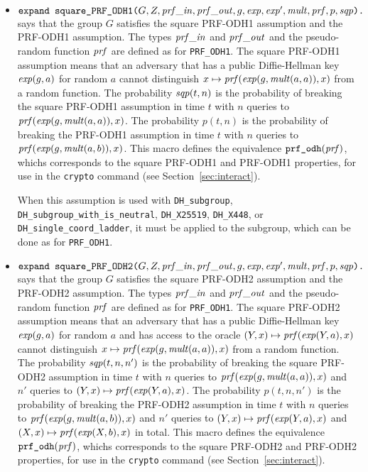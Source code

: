 \documentclass{article}
\begin{document}
\begin{itemize}
\begin{itemize}
\begin{itemize}
     \item $\texttt{expand\ square\_PRF\_ODH1(}G, Z, \mathit{prf\_in}, \mathit{prf\_out}, g, \mathit{exp}, \mathit{exp}', \mathit{mult}, \mathit{prf}, p, \mathit{sqp}\texttt{).}$ says that the group $G$ satisfies the square PRF-ODH1 assumption and the PRF-ODH1 assumption.
       The types $\mathit{prf\_in}$ and $\mathit{prf\_out}$ and the pseudo-random function $\mathit{prf}$ are defined as for \texttt{PRF\_ODH1}.
       The square PRF-ODH1 assumption means that an adversary that has a public Diffie-Hellman key $\mathit{exp}(g,a)$ for random $a$ cannot distinguish $x \mapsto \mathit{prf}(\mathit{exp}(g,\mathit{mult}(a,a)),x)$ from a random function.
       The probability $\mathit{sqp}(t, n)$ is the probability of
       breaking the square PRF-ODH1 assumption in time $t$ with $n$
       queries to $\mathit{prf}(\mathit{exp}(g,\mathit{mult}(a,a)),x)$.
   The probability $p(t, n)$ is the probability of breaking the PRF-ODH1 assumption
   in time $t$ with $n$ queries to $\mathit{prf}(\mathit{exp}(g,\mathit{mult}(a,b)),x)$.
   This macro defines the equivalence
       $\texttt{prf\_odh}(\mathit{prf})$, whichs corresponds to the square PRF-ODH1 and PRF-ODH1 properties, for use in the \texttt{crypto} command (see
       Section~\ref{sec:interact}).

       When this assumption is used with \texttt{DH\_subgroup}, \texttt{DH\_subgroup\_with\_is\_neutral}, \texttt{DH\_X25519},
       \texttt{DH\_X448}, or \texttt{DH\_single\_coord\_ladder}, it
       must be applied to the subgroup, which can be done as for \texttt{PRF\_ODH1}.

       \item $\texttt{expand\ square\_PRF\_ODH2(}G, Z, \mathit{prf\_in}, \mathit{prf\_out}, g, \mathit{exp}, \mathit{exp}', \mathit{mult}, \mathit{prf}, p, \mathit{sqp}\texttt{).}$ says that the group $G$ satisfies the square PRF-ODH2 assumption and the PRF-ODH2 assumption.
       The types $\mathit{prf\_in}$ and $\mathit{prf\_out}$ and the pseudo-random function $\mathit{prf}$ are defined as for \texttt{PRF\_ODH1}.
       The square PRF-ODH2 assumption means that an adversary that has a public Diffie-Hellman key $\mathit{exp}(g,a)$ for random $a$ and has access to the oracle $(Y,x) \mapsto \mathit{prf}(\mathit{exp}(Y,a),x)$ cannot distinguish $x \mapsto \mathit{prf}(\mathit{exp}(g,\mathit{mult}(a,a)),x)$ from a random function.
The probability $\mathit{sqp}(t, n, n')$ is the probability of breaking the square PRF-ODH2 assumption
   in time $t$ with $n$ queries to $\mathit{prf}(\mathit{exp}(g,\mathit{mult}(a,a)),x)$ and $n'$ queries to $(Y,x) \mapsto \mathit{prf}(\mathit{exp}(Y,a),x)$.
       The probability $p(t, n, n')$ is the probability of breaking the PRF-ODH2 assumption
   in time $t$ with $n$ queries to $\mathit{prf}(\mathit{exp}(g,\mathit{mult}(a,b)),x)$ and $n'$ queries to $(Y,x) \mapsto \mathit{prf}(\mathit{exp}(Y,a),x)$ and $(X,x) \mapsto \mathit{prf}(\mathit{exp}(X,b),x)$ in total.
This macro defines the equivalence
       $\texttt{prf\_odh}(\mathit{prf})$, whichs corresponds to the square PRF-ODH2 and PRF-ODH2 properties, for use in the \texttt{crypto} command (see
Section~\ref{sec:interact}).


\end{itemize}
\end{itemize}
\end{itemize}
\end{document}
